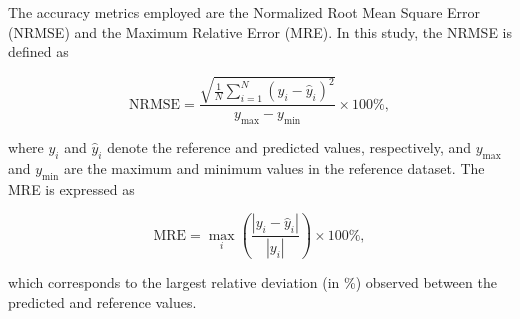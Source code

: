 \documentclass[tg, EN]{ufabcFHZh_tg}
\begin{document}
The accuracy metrics employed are the Normalized Root Mean Square Error (NRMSE) and the Maximum Relative Error (MRE). In this study, the NRMSE is defined as

\begin{equation}
\mathrm{NRMSE} = \frac{\sqrt{\frac{1}{N}\sum_{i=1}^{N} \left( y_i - \hat{y}_i \right)^2}}{y_{\max} - y_{\min}} \times 100\%,
\end{equation}

where \( y_i \) and \( \hat{y}_i \) denote the reference and predicted values, respectively, and \( y_{\max} \) and \( y_{\min} \) are the maximum and minimum values in the reference dataset.  
The MRE is expressed as

\begin{equation}
\mathrm{MRE} = \max_{i} \left( \frac{|y_i - \hat{y}_i|}{|y_i|} \right) \times 100\%,
\end{equation}

which corresponds to the largest relative deviation (in \%) observed between the predicted and reference values.
\end{document}
